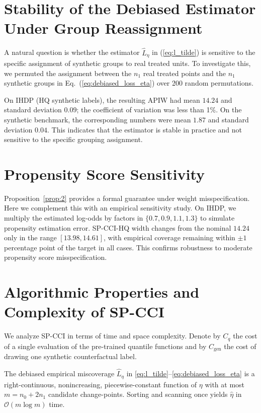 \documentclass{article}
\theoremstyle{plain}
\theoremstyle{definition}
\theoremstyle{remark}
\begin{document}
\section{Stability of the Debiased Estimator Under Group Reassignment}
\label{appendix:permutation}

A natural question is whether the estimator $\hat{L}_\eta$ in (\ref{eq:l_tilde}) is sensitive to the specific assignment of synthetic groups to real treated units. To investigate this, we permuted the assignment between the $n_1$ real treated points and the $n_1$ synthetic groups in Eq.~(\ref{eq:debiased_loss_eta}) over 200 random permutations.

On IHDP (HQ synthetic labels), the resulting APIW had mean $14.24$ and standard deviation $0.09$; the coefficient of variation was less than 1\%. On the synthetic benchmark, the corresponding numbers were mean $1.87$ and standard deviation $0.04$. This indicates that the estimator is stable in practice and not sensitive to the specific grouping assignment.

\section{Propensity Score Sensitivity}
\label{appendix:propensity_sensitivity}

Proposition~\ref{prop:2} provides a formal guarantee under weight misspecification. Here we complement this with an empirical sensitivity study. On IHDP, we multiply the estimated log-odds by factors in $\{0.7, 0.9, 1.1, 1.3\}$ to simulate propensity estimation error. SP-CCI-HQ width changes from the nominal $14.24$ only in the range $[13.98, 14.61]$, with empirical coverage remaining within $\pm 1$ percentage point of the target in all cases. This confirms robustness to moderate propensity score misspecification.

\section{Algorithmic Properties and Complexity of SP-CCI}
\label{sec:complexity}

We analyze SP\mbox{-}CCI in terms of time and space complexity. Denote by \(C_q\) the cost of a single evaluation of the pre-trained quantile functions and by \(C_{\text{gen}}\) the cost of drawing one synthetic counterfactual label.

The debiased empirical miscoverage \(\hat{L}_\eta\) in \eqref{eq:l_tilde}--\eqref{eq:debiased_loss_eta} is a right-continuous, nonincreasing, piecewise-constant function of \(\eta\) with at most $m=n_0+2n_1$ candidate change-points. Sorting and scanning once yields $\hat{\eta}$ in $\mathcal{O}(m\log m)$ time.
\end{document}
